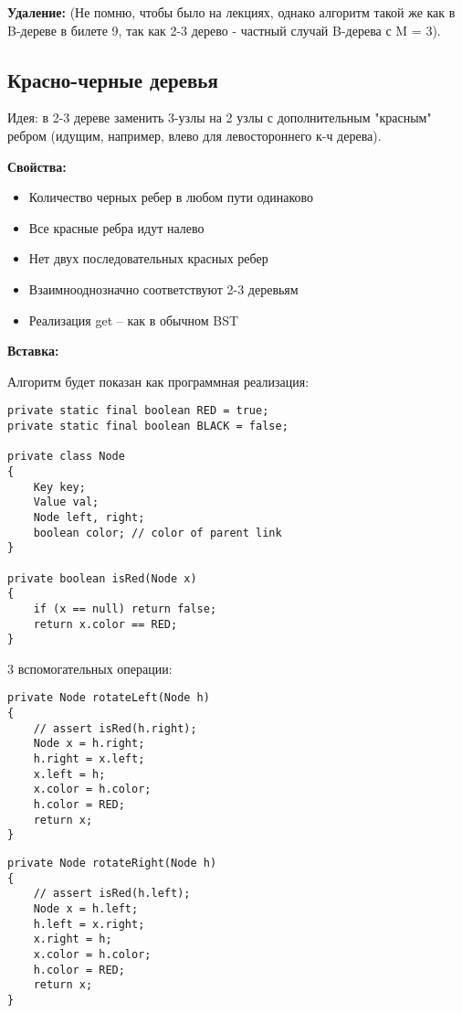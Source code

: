 {\bf Удаление:} (Не помню, чтобы было на лекциях, однако алгоритм такой же как в B-дереве в билете 9, так как 2-3 дерево - частный случай B-дерева с M = 3).

\subsection*{Красно-черные деревья}
Идея: в 2-3 дереве заменить 3-узлы на 2 узлы с дополнительным "красным" ребром (идущим, например, влево для левостороннего к-ч дерева).

{\bf Свойства:}
\begin{itemize}
\item Количество черных ребер в любом пути одинаково
\item Все красные ребра идут налево
\item Нет двух последовательных красных ребер
\item Взаимнооднозначно соответствуют 2-3 деревьям
\item Реализация get – как в обычном BST
\end{itemize}

{\bf Вставка:}

Алгоритм будет показан как программная реализация:

\begin{verbatim}
private static final boolean RED = true;
private static final boolean BLACK = false;

private class Node
{
    Key key;
    Value val;
    Node left, right;
    boolean color; // color of parent link
}

private boolean isRed(Node x)
{
    if (x == null) return false;
    return x.color == RED;
}
\end{verbatim}

3 вспомогательных операции:


\begin{verbatim}
private Node rotateLeft(Node h)
{
    // assert isRed(h.right);
    Node x = h.right;
    h.right = x.left;
    x.left = h;
    x.color = h.color;
    h.color = RED;
    return x;
}
\end{verbatim}


\begin{verbatim}
private Node rotateRight(Node h)
{
    // assert isRed(h.left);
    Node x = h.left;
    h.left = x.right;
    x.right = h;
    x.color = h.color;
    h.color = RED;
    return x;
}

\end{verbatim}


